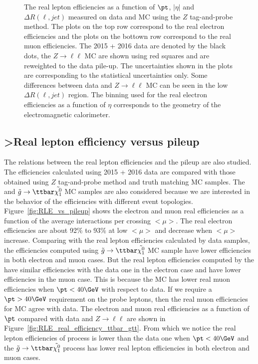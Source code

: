 \begin{figure}[htbp]
\caption{The real lepton efficiencies as a function of $\pt$, $|\eta|$ and $\Delta R(\ell, jet)$ measured on data and MC using the $Z$ tag-and-probe method.
The plots on the top row correspond to the real electron efficiencies and the plots on the bottown row correspond to the real muon efficiencies.
The 2015 + 2016 data are denoted by the black dots, the $Z\to\ell\ell$ MC are shown using red squares and are reweighted to the data pile-up.
The uncertainties shown in the plots are corresponding to the statistical uncertainties only.
Some differences between data and $Z\to \ell\ell$ MC can be seen in the low $\Delta R(\ell, jet)$ region.
The binning used for the real electron efficiencies as a function of $\eta$ corresponds to the geometry of the electromagnetic calorimeter.}
\label{fig:RLE_real_efficiency_pt_eta_dRjet}
\end{figure}



\subsection{>Real lepton efficiency versus pileup}
\label{subsubsec:RLE_vs_pileup}
 
The relations between the real lepton efficiencies and the pileup are also studied.
The efficiencies calculated using 2015 + 2016 data are compared with those obtained using $Z$ tag-and-probe method and truth matching MC samples.
The \ttbar and $\tilde{g}\to\ttbar\tilde{\chi^{0}_{1}}$ MC samples are also considered because we are interested in the behavior of the efficiencies with different event topologies.
Figure~\ref{fig:RLE_vs_pileup} shows the electron and muon real efficiencies as a function of the average interactions per crossing $<\mu>$.
The real electron efficiencies are about 92\% to 93\% at low $<\mu>$ and decrease when $<\mu>$ increase.
Comparing with the real lepton efficiencies calculated by data samples, the efficiencies computed using $\tilde{g}\to\ttbar\tilde{\chi^{0}_{1}}$ MC sample have lower efficiencies in both electron and muon cases.
But the real lepton efficiencies computed by the \ttbar have similar efficiencies with the data one in the electron case and have lower efficiencies in the muon case.
This is because the \ttbar MC has lower real muon efficiencies when $\pt<40 \GeV$ with respect to data.
If we require a $\pt>40 \GeV$ requirement on the probe leptons, then the real muon efficiencies for \ttbar MC agree with data.
The electron and muon real efficiencies as a function of $\pt$ compared with data and $Z\to\ell\ell$ are shown in Figure~\ref{fig:RLE_real_efficiency_ttbar_gtt}.
From which we notice the real lepton efficiencies of \ttbar process is lower than the data one when $\pt<40 \GeV$ and the $\tilde{g}\to\ttbar\tilde{\chi^{0}_{1}}$ process has lower real lepton efficiencies in both electron and muon cases.


